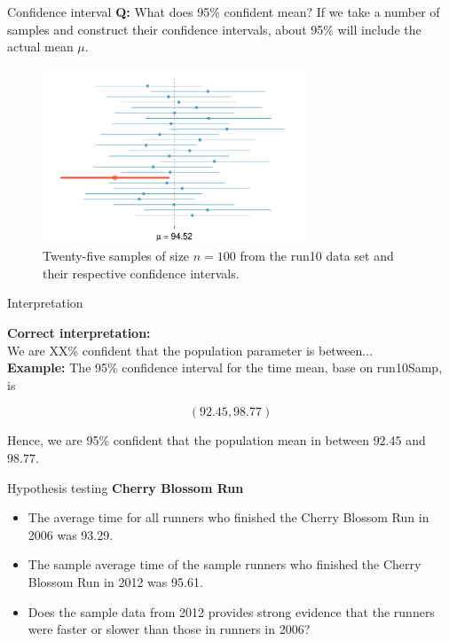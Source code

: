 \documentclass[12pt,a4paper]{beamer}
\begin{document}
\begin{frame}{Confidence interval}
	\textbf{Q:} What does 95\% confident mean?
	If we take a number of samples and construct their confidence intervals, about 95\% will include the actual mean $\mu.$
	\begin{figure}[hht]
	   \centering
	  \caption{Twenty-five samples of size $n=100$ from the run10 data set and their respective confidence intervals.} \includegraphics[width=0.7\textwidth]{figures/95PercentConfidenceInterval/95PercentConfidenceInterval}
	\end{figure}
\end{frame}
\begin{frame}{Interpretation}
	
\textbf{Correct interpretation:}\\
We are XX\% confident that the population parameter is between...
\\
\textbf{Example:}
The 95\% confidence interval for the time mean, base on run10Samp, is 

\[(92.45, 98.77)\]

Hence, we are 95\% confident that the population mean in between $92.45$ and  $98.77$.


\end{frame}
\begin{frame}{Hypothesis testing}
	\textbf{Cherry Blossom Run}\\
\begin{itemize}
	\item The average time for all runners who finished the Cherry Blossom Run in 2006 was 93.29.
	\item The sample average time of the sample runners who finished the Cherry Blossom Run in 2012 was 95.61.
	\item Does the sample data from 2012 provides strong evidence that the runners were faster or slower than those in runners in 2006?
\end{itemize}
\end{frame}
\end{document}
